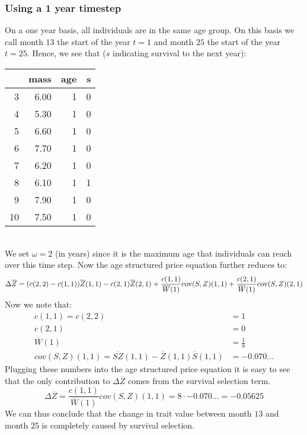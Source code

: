 \subsubsection{Using a 1 year timestep}
On a one year basis, all individuals are in the same age group. On this basis we call month $13$ the start of the year $t=1$ and month $25$ the start of the year $t=25$. Hence, we see that ($s$ indicating survival to the next year):\\
\begin{tabular}{rrrr}
  \hline
 & mass & age & s \\ 
  \hline
3 & 6.00 &   1 &   0 \\ 
  4 & 5.30 &   1 &   0 \\ 
  5 & 6.60 &   1 &   0 \\ 
  6 & 7.70 &   1 &   0 \\ 
  7 & 6.20 &   1 &   0 \\ 
  8 & 6.10 &   1 &   1 \\ 
  9 & 7.90 &   1 &   0 \\ 
  10 & 7.50 &   1 &   0 \\ 
   \hline
\end{tabular} \\
We set $\omega=2$ (in years) since it is the maximum age that individuals can reach over this time step. Now the age structured price equation further reduces to:
\begin{equation}
\Delta \overline{Z} = (c(2,2)-c(1,1))\overline{Z}(1,1) - c(2,1) \overline{Z}(2,1) + \frac{c(1,1)}{\overline{W}(1)} \text{cov}(S,Z)(1,1) + \frac{c(2,1)}{\overline{W}(1)} \text{cov}(S,Z)(2,1)
\end{equation}
Now we note that:
\begin{align*}
c(1,1) = c(2,2) & = 1\\
c(2,1) & = 0 \\
\overline{W}(1) & = \frac{1}{8} \\
cov(S,Z)(1,1) = \overline{SZ}(1,1) - \overline{Z}(1,1)\overline{S}(1,1) & = -0.070\dots
\end{align*}
Plugging these numbers into the age structured price equation it is easy to see that the only contribution to $\Delta \overline{Z}$ comes from the survival selection term.
\begin{equation}
\Delta \overline{Z} = \frac{c(1,1)}{\overline{W}(1)}cov(S,Z)(1,1) = 8 \cdot -0.070\dots = -0.05625
\end{equation}
We can thus conclude that the change in trait value between month $13$ and month $25$ is completely caused by survival selection.
